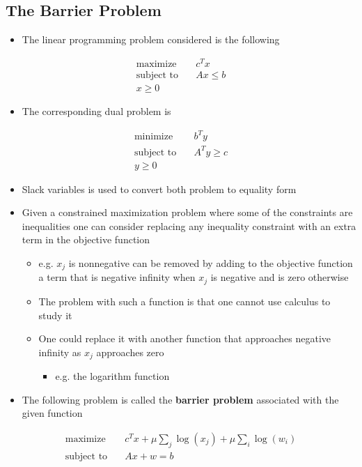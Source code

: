 \documentclass[11pt]{article}
\begin{document}
\subsection{The Barrier Problem}
\label{sec:org50aaeeb}
\begin{itemize}
\item The linear programming problem considered is the following
\end{itemize}
\begin{align*}
  \text{maximize} & \quad c^T x \\
  \text{subject to} & \quad Ax \leq b \\
  x \geq 0 
\end{align*}
\begin{itemize}
\item The corresponding dual problem is
\end{itemize}
\begin{align*}
  \text{minimize} & \quad b^T y \\
  \text{subject to} & \quad A^Ty \geq c \\
  y \geq 0 
\end{align*}
\begin{itemize}
\item Slack variables is used to convert both problem to equality form
\item Given a constrained maximization problem where some of the constraints are inequalities one can consider replacing any inequality constraint with an extra term in the objective function
\begin{itemize}
\item e.g. \(x_j\) is nonnegative can be removed by adding to the objective function a term that is negative infinity when \(x_j\) is negative and is zero otherwise
\item The problem with such a function is that one cannot use calculus to study it
\item One could replace it with another function that approaches negative infinity as \(x_j\) approaches zero
\begin{itemize}
\item e.g. the logarithm function
\end{itemize}
\end{itemize}

\item The following problem is called the \textbf{barrier problem} associated with the given function
\end{itemize}
\begin{align*}
 	\text{maximize}& \quad c^Tx + \mu \sum_j \log(x_j) + \mu \sum_i \log(w_i) \\
  \text{subject to}& \quad Ax + w = b
\end{align*}
\end{document}
